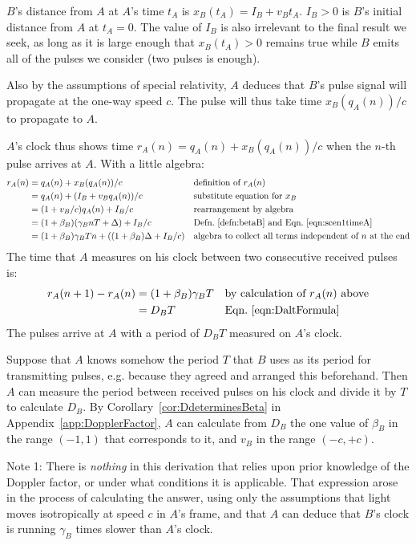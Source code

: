 \documentclass[a4paper]{article}
\theoremstyle{plain}
\theoremstyle{definition}
\begin{document}
$B$'s distance from $A$ at $A$'s time $t_A$ is
$x_B(t_A) = I_B + v_B t_A$.
$I_B > 0$ is $B$'s initial distance from $A$ at $t_A=0$.
The value of $I_B$ is also irrelevant to the final result we seek,
as long as it is large enough that $x_B(t_A) > 0$ remains
true while $B$ emits all of the pulses we consider (two pulses is enough).

Also by the assumptions of special relativity, $A$ deduces that $B$'s
pulse signal will propagate at the one-way speed $c$.  The pulse will
thus take time $x_B(q_A(n))/c$ to propagate to $A$.

$A$'s clock thus shows time $r_A(n) = q_A(n) + x_B(q_A(n))/c$ when the $n$-th
pulse arrives at $A$.  With a little algebra:
\begin{align*}
r_A(n)
  & = q_A(n) + x_B(q_A(n))/c & & \text{definition of $r_A(n)$} \\
  & = q_A(n) + (I_B + v_B q_A(n))/c & & \text{substitute equation for $x_B$} \\
  & = (1 + v_B/c) q_A(n) + I_B/c & & \text{rearrangement by algebra} \\
  & = (1 + \beta_B) (\gamma_B nT + \Delta) + I_B/c & & \text{Defn.~\eqref{defn:betaB} and Eqn.~\eqref{eqn:scen1timeA}} \\
  & = (1 + \beta_B) \gamma_B Tn + ((1 + \beta_B) \Delta + I_B/c) & & \text{algebra to collect all terms independent of $n$ at the end}
\end{align*}
The time that $A$ measures on his clock between two consecutive received
pulses is:
\begin{align*}
r_A(n+1) - r_A(n)
  & = (1 + \beta_B) \gamma_B T & & \text{by calculation of $r_A(n)$ above} \\
  & = D_B T & & \text{Eqn.~\eqref{eqn:DaltFormula}}
\end{align*}
The pulses arrive at $A$ with a period of $D_B T$ measured on $A$'s clock.

Suppose that $A$ knows somehow the period $T$ that $B$ uses as its
period for transmitting pulses, e.g. because they agreed and arranged
this beforehand.  Then $A$ can measure the period between received
pulses on his clock and divide it by $T$ to calculate $D_B$.
By Corollary~\ref{cor:DdeterminesBeta} in
Appendix~\ref{app:DopplerFactor}, $A$ can calculate from $D_B$ the one
value of $\beta_B$ in the range $(-1, 1)$ that corresponds to it, and
$v_B$ in the range $(-c, +c)$.

Note 1: There is {\em nothing} in this derivation that relies upon prior
knowledge of the Doppler factor, or under what conditions it is
applicable.  That expression arose in
the process of calculating the answer, using only the assumptions that
light moves isotropically at speed $c$ in $A$'s frame, and that $A$
can deduce that $B$'s clock is running $\gamma_B$ times slower than
$A$'s clock.
\end{document}
